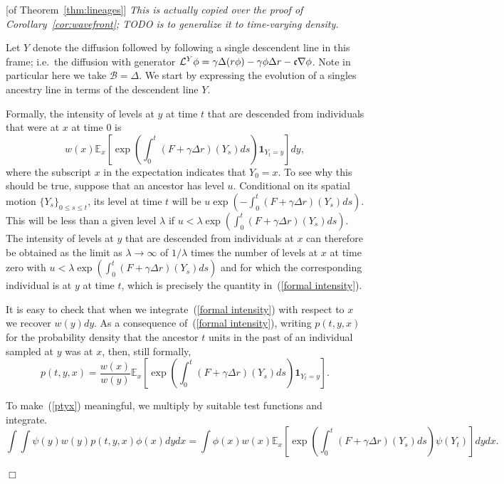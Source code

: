\documentclass[12pt]{article}
\newenvironment {proof}{{\noindent\bf Proof }}{\hfill $\Box$ \medskip}
\newcommand{\IE}{\mathbb E}
\newcommand{\ind}{\mathbf{1}}
\newcommand{\comment}[1]{{\color{blue} \it #1}}
\begin{document}
\begin{proof}[of Theorem~\ref{thm:lineages}]
    \comment{
        This is actually copied over the proof of Corollary~\ref{cor:wavefront};
        TODO is to generalize it to time-varying density.
    }

Let $Y$ denote the diffusion followed by following a single descendent line in this frame; 
i.e.~the diffusion with generator ${\cal L}^Y\phi=\gamma\Delta(r\phi)-\gamma\phi\Delta r -\mathfrak{c}\nabla\phi $. Note in particular here we take $\mathcal{B}=\Delta$. We start by expressing the evolution of a singles ancestry line in terms of the descendent line $Y$.

Formally, the intensity of levels at $y$ at time $t$ that are descended from 
individuals that were at $x$ at time $0$ is
\begin{equation}
\label{formal intensity}
w(x)\IE_x\left[\exp\left(\int_0^t (F+\gamma \Delta r)(Y_s)ds\right)\ind_{Y_t=y}\right]dy,
\end{equation}
where the subscript $x$ in the expectation indicates that $Y_0=x$.
To see why this should be true, 
suppose that an ancestor has level $u$. Conditional on its 
spatial motion $\{Y_s\}_{0\leq s\leq t}$, its level at time $t$ will
be $u\exp(-\int_0^t(F+\gamma\Delta r)(Y_s)ds)$. This will be less than a given level 
$\lambda$ if $u<\lambda \exp(\int_0^t(F+\gamma\Delta r)(Y_s)ds)$. 
The intensity of levels at $y$ that are descended from individuals at
$x$ can therefore be obtained as the limit as $\lambda\to\infty$ of 
$1/\lambda$ times the number of levels at $x$ at time zero with
$u<\lambda \exp(\int_0^t(F+\gamma\Delta r)(Y_s)ds)$ and for which
the corresponding individual is at $y$ at time $t$, which is 
precisely the quantity in~(\ref{formal intensity}). 

It is easy to check that when we integrate~(\ref{formal intensity})
with respect to $x$ we recover $w(y)dy$. 
As a consequence of~(\ref{formal intensity}), writing $p(t,y,x)$ for
the probability density that the ancestor $t$ units in 
the past of an individual sampled 
at $y$ was at $x$, then, still formally,
\begin{equation}
\label{ptyx}
p(t,y,x)=\frac{w(x)}{w(y)}\IE_x\left[\exp\left(\int_0^t (F+\gamma\Delta r)(Y_s)ds\right)
\ind_{Y_t=y}\right].
\end{equation}

To make~(\ref{ptyx}) meaningful, we multiply by suitable test functions and 
integrate.
$$\int\int \psi(y)w(y)p(t,y,x)\phi(x)dydx=\int\phi(x)w(x)
\IE_x\left[\exp\left(\int_0^t(F+\gamma\Delta r)(Y_s)ds\right)\psi(Y_t)\right]dydx.$$


\end{proof}
\end{document}
